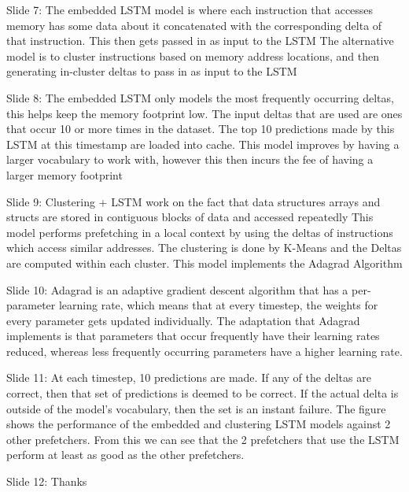 \documentclass[11pt]{article}
\begin{document}
Slide 7: The embedded LSTM model is where each instruction that accesses memory
         has some data about it concatenated with the corresponding delta of that
         instruction. This then gets passed in as input to the LSTM
         The alternative model is to cluster instructions based on memory address
         locations, and then generating in-cluster deltas to pass in as input
         to the LSTM

Slide 8: The embedded LSTM only models the most frequently occurring deltas, this
         helps keep the memory footprint low.
         The input deltas that are used are ones that occur 10 or more times in
         the dataset.
         The top 10 predictions made by this LSTM at this timestamp are loaded
         into cache.
         This model improves by having a larger vocabulary to work with,
         however this then incurs the fee of having a larger memory footprint

Slide 9: Clustering + LSTM work on the fact that data structures arrays and structs
         are stored in contiguous blocks of data and accessed repeatedly
         This model performs prefetching in a local context by using the deltas
         of instructions which access similar addresses.
         The clustering is done by K-Means and the Deltas are computed within
         each cluster.
         This model implements the Adagrad Algorithm

Slide 10: Adagrad is an adaptive gradient descent algorithm that has a per-parameter
          learning rate, which means that at every timestep, the weights for every
          parameter gets updated individually.
          The adaptation that Adagrad implements is that parameters that occur
          frequently have their learning rates reduced, whereas less frequently
          occurring parameters have a higher learning rate.

Slide 11: At each timestep, 10 predictions are made. If any of the deltas are
          correct, then that set of predictions is deemed to be correct.
          If the actual delta is outside of the model's vocabulary, then the
          set is an instant failure.
          The figure shows the performance of the embedded and clustering LSTM
          models against 2 other prefetchers.
          From this we can see that the 2 prefetchers that use the LSTM
          perform at least as good as the other prefetchers.

Slide 12: Thanks
\end{document}
